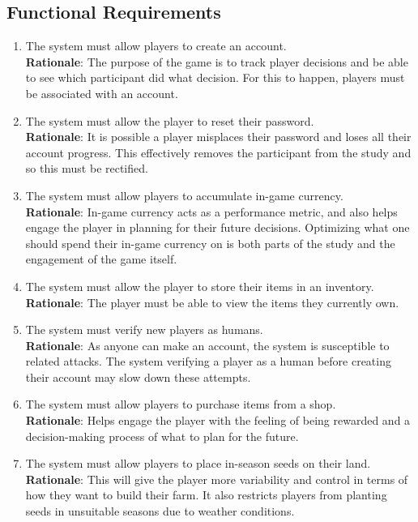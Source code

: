 \documentclass{article}
\begin{document}
\subsection{Functional Requirements}
\begin{enumerate}[{FR}1. ]
    \item \label{FR1} The system must allow players to create an account.\\
    \textbf{Rationale}: The purpose of the game is to track player decisions and be able to see which participant did what decision. For this to happen, players must be associated with an account.
    \item \label{FR2} The system must allow the player to reset their password.\\
    \textbf{Rationale}: It is possible a player misplaces their password and loses all their account progress. This effectively removes the participant from the study and so this must be rectified.
    \item \label{FR3} The system must allow players to accumulate in-game currency.\\
    \textbf{Rationale}: In-game currency acts as a performance metric, and also helps engage the player in planning for their future decisions. Optimizing what one should spend their in-game currency on is both parts of the study and the engagement of the game itself.
    \item \label{FR4} The system must allow the player to store their items in an inventory.
    \textbf{Rationale}: The player must be able to view the items they currently own.
    \item \label{FR5} The system must verify new players as humans.\\
    \textbf{Rationale}: As anyone can make an account, the system is susceptible to related attacks. The system verifying a player as a human before creating their account may slow down these attempts.
    \item \label{FR6} The system must allow players to purchase items from a shop.\\
    \textbf{Rationale}: Helps engage the player with the feeling of being rewarded and a decision-making process of what to plan for the future.
    \item \label{FR7} The system must allow players to place in-season seeds on their land.\\
    \textbf{Rationale}: This will give the player more variability and control in terms of how they want to build their farm. It also restricts players from planting seeds in unsuitable seasons due to weather conditions.

\end{enumerate}
\end{document}
